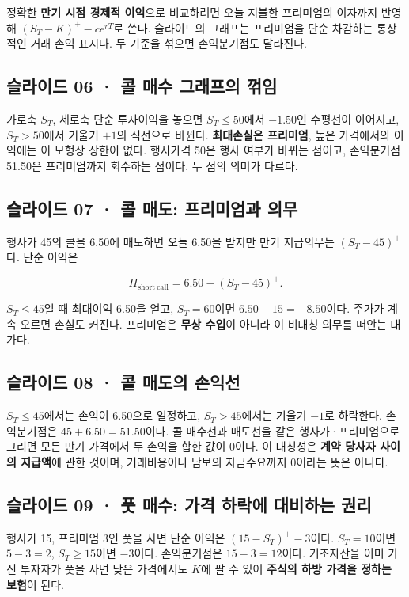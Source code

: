 \documentclass[11pt,a4paper]{article}
\begin{document}
정확한 \textbf{만기 시점 경제적 이익}으로 비교하려면 오늘 지불한 프리미엄의 이자까지 반영해 $(S_T-K)^+-ce^{rT}$로 쓴다. 슬라이드의 그래프는 프리미엄을 단순 차감하는 통상적인 거래 손익 표시다. 두 기준을 섞으면 손익분기점도 달라진다.\par

\subsection{슬라이드 06 · 콜 매수 그래프의 꺾임}
가로축 $S_T$, 세로축 단순 투자이익을 놓으면 $S_T\leq50$에서 $-1.50$인 수평선이 이어지고, $S_T>50$에서 기울기 $+1$의 직선으로 바뀐다. \textbf{최대손실은 프리미엄}, 높은 가격에서의 이익에는 이 모형상 상한이 없다. 행사가격 50은 행사 여부가 바뀌는 점이고, 손익분기점 51.50은 프리미엄까지 회수하는 점이다. 두 점의 의미가 다르다.\par

\subsection{슬라이드 07 · 콜 매도: 프리미엄과 의무}
행사가 45의 콜을 6.50에 매도하면 오늘 6.50을 받지만 만기 지급의무는 $(S_T-45)^+$다. 단순 이익은\par

\[
\Pi_{\mathrm{short\ call}}=6.50-(S_T-45)^+.
\]

$S_T\leq45$일 때 최대이익 6.50을 얻고, $S_T=60$이면 $6.50-15=-8.50$이다. 주가가 계속 오르면 손실도 커진다. 프리미엄은 \textbf{무상 수입}이 아니라 이 비대칭 의무를 떠안는 대가다.\par

\subsection{슬라이드 08 · 콜 매도의 손익선}
$S_T\leq45$에서는 손익이 6.50으로 일정하고, $S_T>45$에서는 기울기 $-1$로 하락한다. 손익분기점은 $45+6.50=51.50$이다. 콜 매수선과 매도선을 같은 행사가·프리미엄으로 그리면 모든 만기 가격에서 두 손익을 합한 값이 0이다. 이 대칭성은 \textbf{계약 당사자 사이의 지급액}에 관한 것이며, 거래비용이나 담보의 자금수요까지 0이라는 뜻은 아니다.\par

\subsection{슬라이드 09 · 풋 매수: 가격 하락에 대비하는 권리}
행사가 15, 프리미엄 3인 풋을 사면 단순 이익은 $(15-S_T)^+-3$이다. $S_T=10$이면 $5-3=2$, $S_T\geq15$이면 $-3$이다. 손익분기점은 $15-3=12$이다. 기초자산을 이미 가진 투자자가 풋을 사면 낮은 가격에서도 $K$에 팔 수 있어 \textbf{주식의 하방 가격을 정하는 보험}이 된다.\par
\end{document}

